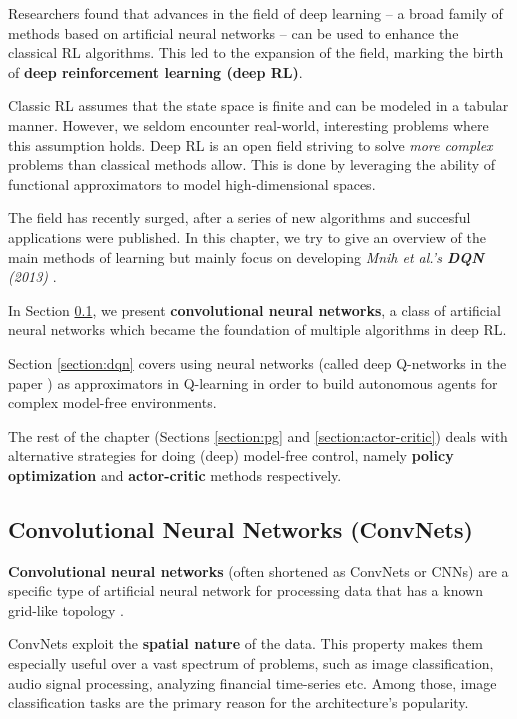 Researchers found that advances in the field of deep learning -- a broad family of methods based on artificial neural networks -- can be used to enhance the classical RL algorithms.
This led to the expansion of the field, marking the birth of \textbf{deep reinforcement learning (deep RL)}.

Classic RL assumes that the state space is finite and can be modeled in a tabular manner.
However, we seldom encounter real-world, interesting problems where this assumption holds.
Deep RL is an open field striving to solve \emph{more complex} problems than classical methods allow.
This is done by leveraging the ability of functional approximators to model high-dimensional spaces.

The field has recently surged, after a series of new algorithms and succesful applications were published.
In this chapter, we try to give an overview of the main methods of learning but mainly focus on developing \emph{Mnih et al.'s \textbf{DQN} (2013)} \cite{atari-dqn}.

In Section \ref{section:convnets}, we present \textbf{convolutional neural networks}, a class of artificial neural networks which became the foundation of multiple algorithms in deep RL.

Section \ref{section:dqn} covers using neural networks (called deep Q-networks in the paper \cite{atari-dqn}) as approximators in Q-learning in order to build autonomous agents for complex model-free environments.

The rest of the chapter (Sections \ref{section:pg} and \ref{section:actor-critic}) deals with alternative strategies for doing (deep) model-free control, namely \textbf{policy optimization} and \textbf{actor-critic} methods respectively.

\clearpage

\subsection{Convolutional Neural Networks (ConvNets)} \label{section:convnets}
\textbf{Convolutional neural networks} (often shortened as ConvNets or CNNs) are a specific type of artificial neural network for processing data that has a known grid-like topology \cite{Goodfellow-et-al-2016}.

ConvNets exploit the \textbf{spatial nature} of the data.
This property makes them especially useful over a vast spectrum of problems, such as image classification, audio signal processing, analyzing financial time-series etc.
Among those, image classification tasks are the primary reason for the architecture's popularity.

